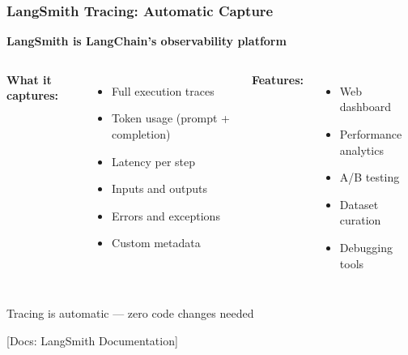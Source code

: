 \documentclass[aspectratio=169,11pt]{beamer}
\newcommand{\docref}[1]{{\scriptsize\color{docgray}[Docs: #1]}}
\begin{document}

\begin{frame}
  \frametitle{LangSmith Tracing: Automatic Capture}

  \begin{center}
    \textbf{LangSmith is LangChain's observability platform}
  \end{center}

  \vspace{0.15cm}

  \begin{columns}[T]
    \textbf{What it captures:}
    \begin{itemize}
    \setlength{\itemsep}{1pt}
      \item Full execution traces
      \item Token usage (prompt + completion)
      \item Latency per step
      \item Inputs and outputs
      \item Errors and exceptions
      \item Custom metadata
    \end{itemize}

    \textbf{Features:}
    \begin{itemize}
    \setlength{\itemsep}{1pt}
      \item Web dashboard
      \item Performance analytics
      \item A/B testing
      \item Dataset curation
      \item Debugging tools
    \end{itemize}
  \end{columns}

  \vspace{0.15cm}

  \begin{conceptbox}
    Tracing is automatic — zero code changes needed
  \end{conceptbox}

  \docref{LangSmith Documentation}
\end{frame}

\end{document}
